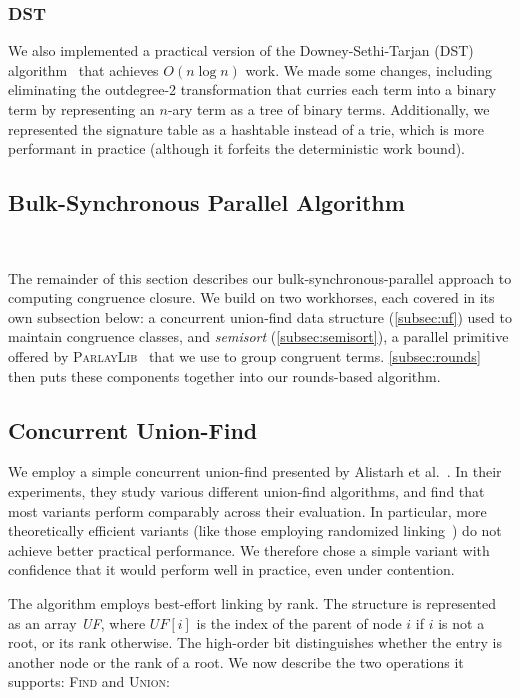 \subsubsection{DST}We also implemented a practical version of the Downey-Sethi-Tarjan (DST)
algorithm~\cite{downey-sethi-tarjan} that achieves $O(n \log n)$ work. We made some changes, including
eliminating the outdegree-2 transformation that curries each term into a binary
term by representing an $n$-ary term as a tree of binary terms. Additionally,
we represented the signature table as a hashtable instead of a trie, which is
more performant in practice (although it forfeits the deterministic work bound).


\subsection{Bulk-Synchronous Parallel Algorithm}~\label{sec:algorithm:parallel}

The remainder of this section describes our bulk-synchronous-parallel
approach to computing congruence closure. We build on two workhorses, each
covered in its own subsection below: a concurrent union-find data structure
(\autoref{subsec:uf}) used to maintain congruence classes, and
\textit{semisort} (\autoref{subsec:semisort}), a parallel primitive offered
by \textsc{ParlayLib}~\cite{parlaylib} that we use to group congruent terms.
\autoref{subsec:rounds} then puts these components together into our
rounds-based algorithm.

\subsection{Concurrent Union-Find}
\label{subsec:uf}

We employ a simple concurrent union-find presented by Alistarh et al.~\cite{uf}.
In their experiments, they study various different union-find algorithms, and
find that most variants perform comparably across their evaluation. In
particular, more theoretically efficient variants (like those employing
randomized linking~\cite{jayanti16}) do not achieve better practical
performance. We therefore chose a simple variant with confidence that it would
perform well in practice, even under contention.

The algorithm employs best-effort linking by rank. The structure is represented
as an array \textit{UF}, where $\mathit{UF}[i]$ is the index of the parent of
node $i$ if $i$ is not a root, or its rank otherwise. The high-order bit
distinguishes whether the entry is another node or the rank of a root. We now
describe the two operations it supports: \textsc{Find} and \textsc{Union}:

